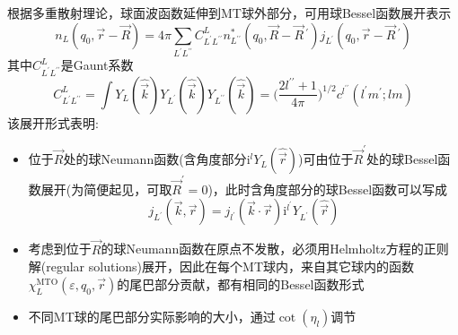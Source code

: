 {{		根据多重散射理论，球面波函数延伸到\textrm{MT}球外部分，可用球\textrm{Bessel}函数展开表示
		\begin{displaymath}
			n_L(q_0,\vec r-\vec R)=4\pi\sum_{L^{\prime}L^{\prime\prime}}C_{L^{\prime}L^{\prime\prime}}^Ln_{L^{\prime\prime}}^{\ast}(q_0,\vec R-\vec R\,^{\prime})j_{L^{\prime}}(q_0,\vec r-\vec R\,^{\prime})
		\end{displaymath}
		其中$C_{L^{\prime}L^{\prime\prime}}^L$是\textrm{Gaunt}系数
		\begin{displaymath}
			C_{L^{\prime}L^{\prime\prime}}^L=\int Y_L(\hat{\vec k})Y_{L^{\prime}}(\hat{\vec k})Y_{L^{\prime\prime}}(\hat{\vec k})=\bigg(\dfrac{2l^{\prime\prime}+1}{4\pi}\bigg)^{1/2}c^{l^{\prime\prime}}(l^{\prime}m^{\prime};lm)
		\end{displaymath}
		该展开形式表明:
		\begin{itemize}
			\item 位于$\vec R$处的球\textrm{Neumann}函数(含角度部分$\mathrm{i}^lY_L(\hat{\vec r})$)可由位于$\vec R^{\prime}$处的球\textrm{Bessel}函数展开(为简便起见，可取$\vec R^{\prime}=0$)，此时含角度部分的球\textrm{Bessel}函数可以写成
				\begin{displaymath}
					j_{L^{\prime}}(\vec k,\vec r)=j_{l^{\prime}}(\vec k\cdot\vec r)\mathrm{i}^{l^{\prime}}Y_{L^{\prime}}(\hat{\vec r})
				\end{displaymath}
			\item 考虑到位于$\vec R$的球\textrm{Neumann}函数在原点不发散，必须用\textrm{Helmholtz}方程的正则解\textrm{(regular solutions)}展开，因此在每个\textrm{MT}球内，来自其它球内的函数$\chi_L^{\mathrm{MTO}}(\varepsilon,q_0,\vec r)$的尾巴部分贡献，都有相同的\textrm{Bessel}函数形式
		\item 不同\textrm{MT}球的尾巴部分实际影响的大小，通过$\cot(\eta_l)$调节
		\end{itemize}

}

}
